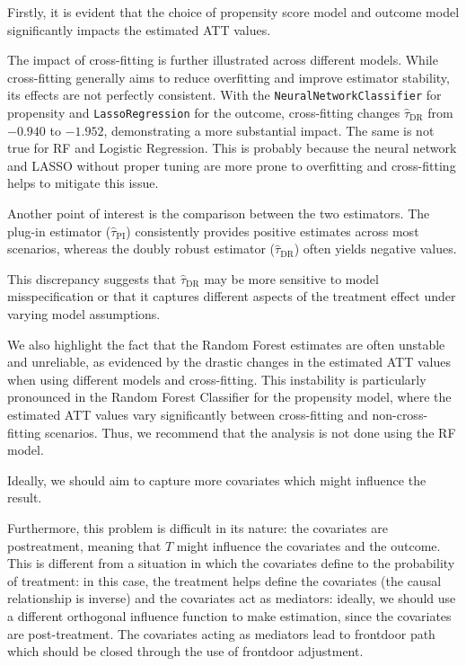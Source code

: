 \documentclass{article}
\begin{document}
Firstly, it is evident that the choice of propensity score model and outcome model significantly impacts the estimated ATT values. 

The impact of cross-fitting is further illustrated across different models. While cross-fitting generally aims to reduce overfitting and improve estimator stability, its effects are not perfectly consistent. With the \texttt{NeuralNetworkClassifier} for propensity and \texttt{LassoRegression} for the outcome, cross-fitting changes $\hat{\tau}_{\text{DR}}$ from $-0.940$ to $-1.952$, demonstrating a more substantial impact. The same is not true for RF and Logistic Regression. This is probably because the neural network and LASSO without proper tuning are more prone to overfitting and cross-fitting helps to mitigate this issue.

Another point of interest is the comparison between the two estimators. The plug-in estimator ($\hat{\tau}_{\text{PI}}$) consistently provides positive estimates across most scenarios, whereas the doubly robust estimator ($\hat{\tau}_{\text{DR}}$) often yields negative values.

This discrepancy suggests that $\hat{\tau}_{\text{DR}}$ may be more sensitive to model misspecification or that it captures different aspects of the treatment effect under varying model assumptions.

We also highlight the fact that the Random Forest estimates are often unstable and unreliable, as evidenced by the drastic changes in the estimated ATT values when using different models and cross-fitting. This instability is particularly pronounced in the Random Forest Classifier for the propensity model, where the estimated ATT values vary significantly between cross-fitting and non-cross-fitting scenarios. Thus, we recommend that the analysis is not done using the RF model.

Ideally, we should aim to capture more covariates which might influence the result.

Furthermore, this problem is difficult in its nature: the covariates are postreatment, meaning that $T$ might influence the covariates and the outcome. This is different from a situation in which the covariates define to the probability of treatment: in this case, the treatment helps define the covariates (the causal relationship is inverse) and the covariates act as mediators: ideally, we should use a different orthogonal influence function to make estimation, since the covariates are post-treatment. The covariates acting as mediators lead to frontdoor path which should be closed through the use of frontdoor adjustment.
\end{document}
